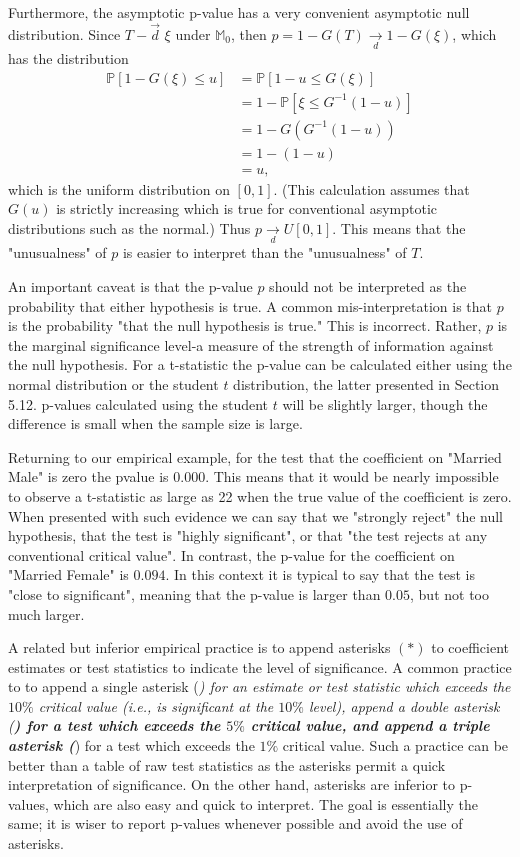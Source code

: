 \documentclass[10pt]{article}
\begin{document}
Furthermore, the asymptotic p-value has a very convenient asymptotic null distribution. Since $T-\vec{d}$ $\xi$ under $\mathbb{M}_{0}$, then $p=1-G(T) \underset{d}{\longrightarrow} 1-G(\xi)$, which has the distribution
$$
\begin{aligned}
\mathbb{P}[1-G(\xi) \leq u] &=\mathbb{P}[1-u \leq G(\xi)] \\
&=1-\mathbb{P}\left[\xi \leq G^{-1}(1-u)\right] \\
&=1-G\left(G^{-1}(1-u)\right) \\
&=1-(1-u) \\
&=u,
\end{aligned}
$$
which is the uniform distribution on $[0,1]$. (This calculation assumes that $G(u)$ is strictly increasing which is true for conventional asymptotic distributions such as the normal.) Thus $p \underset{d}{\longrightarrow} U[0,1]$. This means that the "unusualness" of $p$ is easier to interpret than the "unusualness" of $T$.

An important caveat is that the $\mathrm{p}$-value $p$ should not be interpreted as the probability that either hypothesis is true. A common mis-interpretation is that $p$ is the probability "that the null hypothesis is true." This is incorrect. Rather, $p$ is the marginal significance level-a measure of the strength of information against the null hypothesis. For a t-statistic the p-value can be calculated either using the normal distribution or the student $t$ distribution, the latter presented in Section 5.12. p-values calculated using the student $t$ will be slightly larger, though the difference is small when the sample size is large.

Returning to our empirical example, for the test that the coefficient on "Married Male" is zero the pvalue is $0.000$. This means that it would be nearly impossible to observe a t-statistic as large as 22 when the true value of the coefficient is zero. When presented with such evidence we can say that we "strongly reject" the null hypothesis, that the test is "highly significant", or that "the test rejects at any conventional critical value". In contrast, the p-value for the coefficient on "Married Female" is $0.094$. In this context it is typical to say that the test is "close to significant", meaning that the p-value is larger than $0.05$, but not too much larger.

A related but inferior empirical practice is to append asterisks $(*)$ to coefficient estimates or test statistics to indicate the level of significance. A common practice to to append a single asterisk (\textit{) for an estimate or test statistic which exceeds the $10 \%$ critical value (i.e., is significant at the $10 \%$ level), append a double asterisk (\textbf{) for a test which exceeds the $5 \%$ critical value, and append a triple asterisk (}}) for a test which exceeds the $1 \%$ critical value. Such a practice can be better than a table of raw test statistics as the asterisks permit a quick interpretation of significance. On the other hand, asterisks are inferior to p-values, which are also easy and quick to interpret. The goal is essentially the same; it is wiser to report p-values whenever possible and avoid the use of asterisks.
\end{document}
